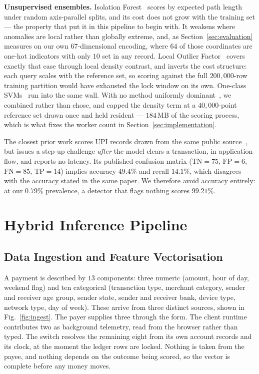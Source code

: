 \documentclass[conference]{IEEEtran}
\begin{document}
\textbf{Unsupervised ensembles.} Isolation Forest~\cite{liu2008} scores
by expected path length under random axis-parallel splits, and its cost
does not grow with the training set --- the property that put it in
this pipeline to begin with. It weakens where anomalies are local
rather than globally extreme, and, as
Section~\ref{sec:evaluation} measures on our own $67$-dimensional
encoding, where $64$ of those coordinates are one-hot indicators with
only $10$ set in any record. Local Outlier
Factor~\cite{breunig2000} covers exactly that case through local
density contrast, and inverts the cost structure: each query scales
with the reference set, so scoring against the full $200{,}000$-row
training partition would have exhausted the lock window on its own.
One-class SVMs~\cite{scholkopf2001} run into the same wall. With no
method uniformly dominant~\cite{campos2016}, we combined rather than
chose, and capped the density term at a $40{,}000$-point reference set
drawn once and held resident --- $184$\,MB of the scoring process,
which is what fixes the worker count in
Section~\ref{sec:implementation}.

The closest prior work scores UPI records drawn from the same public
source~\cite{kumar2026}, but issues a step-up challenge \emph{after}
the model clears a transaction, in application flow, and reports no
latency. Its published confusion matrix ($\mathrm{TN}{=}75$,
$\mathrm{FP}{=}6$, $\mathrm{FN}{=}85$, $\mathrm{TP}{=}14$) implies
accuracy $49.4\%$ and recall $14.1\%$, which disagrees with the
accuracy stated in the same paper. We therefore avoid accuracy
entirely: at our $0.79\%$ prevalence, a detector that flags nothing
scores $99.21\%$.

\section{Hybrid Inference Pipeline}
\label{sec:methodology}

\subsection{Data Ingestion and Feature Vectorisation}

A payment is described by $13$ components: three numeric (amount, hour
of day, weekend flag) and ten categorical (transaction type, merchant
category, sender and receiver age group, sender state, sender and
receiver bank, device type, network type, day of week). These arrive
from three distinct sources, shown in Fig.~\ref{fig:ingest}. The payer
supplies three through the form. The client runtime contributes two as
background telemetry, read from the browser rather than typed. The
switch resolves the remaining eight from its own account records and
its clock, at the moment the ledger rows are locked. Nothing is taken
from the payee, and nothing depends on the outcome being scored, so the
vector is complete before any money moves.
\end{document}
